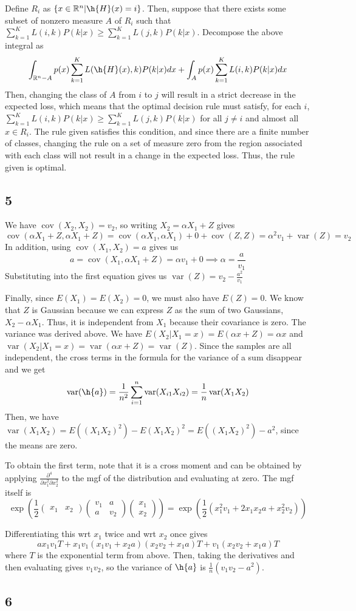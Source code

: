 \documentclass{article}
\newcommand{\openm}{\begin{pmatrix}}
\newcommand{\closem}{\end{pmatrix}}
\DeclareMathOperator{\cov}{cov}
\DeclareMathOperator{\var}{var}
\newcommand{\rn}{\mathbb{R}}
\begin{document}
Define $R_i$ as $\{x\in\rn^n|\h{H}(x)=i\}$. Then, suppose that there exists some subset of nonzero measure $A$ of $R_i$ such that $\sum_{k=1}^KL(i, k)P(k|x)\ge\sum_{k=1}^KL(j, k)P(k|x)$. Decompose the above integral as
\[\int_{\rn^n-A}p(x)\sum_{k=1}^KL(\h{H}(x), k)P(k|x)dx+\int_Ap(x)\sum_{k=1}^KL(i, k)P(k|x)dx\]
Then, changing the class of $A$ from $i$ to $j$ will result in a strict decrease in the expected loss, which means that the optimal decision rule must satisfy, for each $i$, $\sum_{k=1}^KL(i, k)P(k|x)\ge\sum_{k=1}^KL(j, k)P(k|x)$ for all $j\neq i$ and almost all $x\in R_i$. The rule given satisfies this condition, and since there are a finite number of classes, changing the rule on a set of measure zero from the region associated with each class will not result in a change in the expected loss. Thus, the rule given is optimal.
\subsection*{5}
We have $\cov(X_2,X_2)=v_2$, so writing $X_2=\alpha X_1+Z$ gives
\[\cov(\alpha X_1+Z, \alpha X_1+Z)=\cov(\alpha X_1, \alpha X_1)+0+\cov(Z, Z)=\alpha^2v_1+\var(Z)=v_2\]
In addition, using $\cov(X_1, X_2)=a$ gives us
\[a=\cov(X_1, \alpha X_1+Z)=\alpha v_1+0\implies \alpha=\frac{a}{v_1}\]
Substituting into the first equation gives us $\var(Z)=v_2-\frac{a^2}{v_1}$

Finally, since $E(X_1)=E(X_2)=0$, we must also have $E(Z)=0$.
We know that $Z$ is Gaussian because we can express $Z$ as the sum of two Gaussians, $X_2-\alpha X_1$. Thus, it is independent from $X_1$ because their covariance is zero. The variance was derived above.
We have $E(X_2|X_1=x)=E(\alpha x+Z)=\alpha x$ and $\var(X_2|X_1=x)=\var(\alpha x+Z)=\var(Z)$. 
Since the samples are all independent, the cross terms in the formula for the variance of a sum disappear and we get
\[\var(\h{a})=\frac{1}{n^2}\sum_{i=1}^n\var(X_{i1}X_{i2})=\frac{1}{n}\var(X_1X_2)\]
Then, we have $\var(X_1X_2)=E((X_1X_2)^2)-E(X_1X_2)^2=E((X_1X_2)^2)-a^2$, since the means are zero.

To obtain the first term, note that it is a cross moment and can be obtained by applying $\frac{\partial^4}{\partial x_1^2\partial x_2^2}$ to the mgf of the distribution and evaluating at zero. The mgf itself is
\[\exp\left(\frac{1}{2}\openm x_1&x_2\closem\openm v_1&a\\a&v_2\closem\openm x_1\\x_2\closem\right)=\exp\left(\frac{1}{2}(x_1^2v_1+2x_1x_2a+x_2^2v_2)\right)\]

Differentiating this wrt $x_1$ twice and wrt $x_2$ once gives 
\[ax_1v_1T+x_1v_1(x_1v_1+x_2a)(x_2v_2+x_1a)T+v_1(x_2v_2+x_1a)T\]
where $T$ is the exponential term from above. Then, taking the derivatives and then evaluating gives $v_1v_2$, so the variance of $\h{a}$ is $\frac{1}{n}(v_1v_2-a^2)$.
\subsection*{6}
\end{document}
